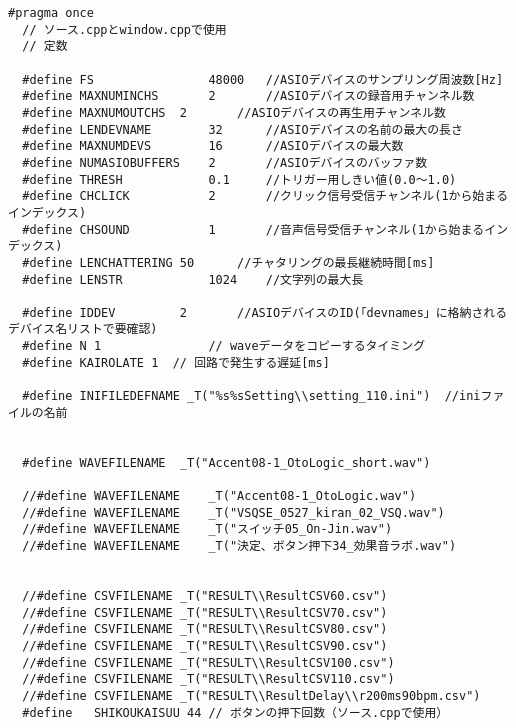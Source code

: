 \begin{lstlisting}[caption=main.h]
  #pragma once
  // ソース.cppとwindow.cppで使用
  // 定数

  #define FS				48000	//ASIOデバイスのサンプリング周波数[Hz]
  #define MAXNUMINCHS		2		//ASIOデバイスの録音用チャンネル数
  #define MAXNUMOUTCHS	2		//ASIOデバイスの再生用チャンネル数
  #define LENDEVNAME		32		//ASIOデバイスの名前の最大の長さ
  #define MAXNUMDEVS		16		//ASIOデバイスの最大数
  #define NUMASIOBUFFERS	2		//ASIOデバイスのバッファ数
  #define THRESH			0.1		//トリガー用しきい値(0.0～1.0)
  #define CHCLICK			2		//クリック信号受信チャンネル(1から始まるインデックス)
  #define CHSOUND			1		//音声信号受信チャンネル(1から始まるインデックス)
  #define LENCHATTERING	50		//チャタリングの最長継続時間[ms]
  #define LENSTR			1024	//文字列の最大長

  #define IDDEV			2		//ASIOデバイスのID(「devnames」に格納されるデバイス名リストで要確認)
  #define N 1               // waveデータをコピーするタイミング
  #define KAIROLATE 1  // 回路で発生する遅延[ms]

  #define INIFILEDEFNAME _T("%s%sSetting\\setting_110.ini")  //iniファイルの名前


  #define WAVEFILENAME	_T("Accent08-1_OtoLogic_short.wav")

  //#define WAVEFILENAME	_T("Accent08-1_OtoLogic.wav")
  //#define WAVEFILENAME	_T("VSQSE_0527_kiran_02_VSQ.wav")
  //#define WAVEFILENAME	_T("スイッチ05_On-Jin.wav")
  //#define WAVEFILENAME	_T("決定、ボタン押下34_効果音ラボ.wav")


  //#define CSVFILENAME _T("RESULT\\ResultCSV60.csv")
  //#define CSVFILENAME _T("RESULT\\ResultCSV70.csv")
  //#define CSVFILENAME _T("RESULT\\ResultCSV80.csv")
  //#define CSVFILENAME _T("RESULT\\ResultCSV90.csv")
  //#define CSVFILENAME _T("RESULT\\ResultCSV100.csv")
  //#define CSVFILENAME _T("RESULT\\ResultCSV110.csv")
  //#define CSVFILENAME _T("RESULT\\ResultDelay\\r200ms90bpm.csv")
  #define	SHIKOUKAISUU 44 // ボタンの押下回数（ソース.cppで使用）

  \end{lstlisting}


